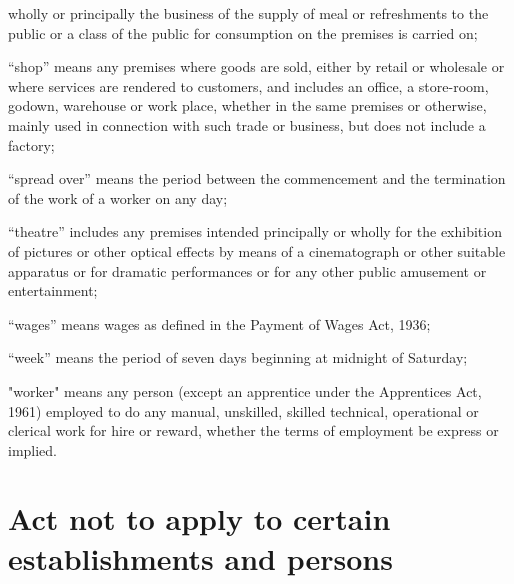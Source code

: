 \documentclass[billwithdocket]{mhact}
\begin{document}
\begin{subsectionlist}
wholly or principally the business of the supply of meal or refreshments
to the public or a class of the public for consumption on the premises is
carried on;
\item ``shop'' means any premises where goods are sold, either by
retail or wholesale or where services are rendered to customers, and
includes an office, a store-room, godown, warehouse or work place,
whether in the same premises or otherwise, mainly used in connection
with such trade or business, but does not include a factory;
\item ``spread over'' means the period between the commencement
and the termination of the work of a worker on any day;
\item ``theatre'' includes any premises intended principally or wholly
for the exhibition of pictures or other optical effects by means of a
cinematograph or other suitable apparatus or for dramatic performances
or for any other public amusement or entertainment;
\item ``wages'' means wages as defined in the Payment of Wages Act,
1936;
\item ``week'' means the period of seven days beginning at midnight
of Saturday;
\item "worker" means any person (except an apprentice under the
Apprentices Act, 1961) employed to do any manual, unskilled, skilled
technical, operational or clerical work for hire or reward, whether the
terms of employment be express or implied.

\end{subsectionlist}


\section{Act not to apply to certain establishments and persons}
\end{document}
